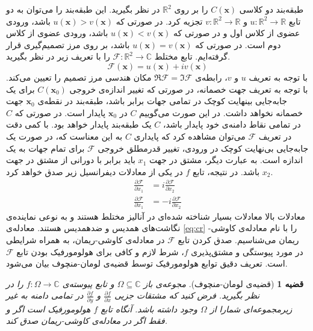 \documentclass[12pt,onecolumn,a4paper]{article}
\newtheorem{theorem}{قضیه}[section]
\begin{document}
طبقه‌بند دو کلاسی $C(\mathbf{x})$ را بر روی $\mathbb{R}^2$ در نظر بگیرید. این طبقه‌بند را می‌توان به دو تابع $u:\mathbb{R}^2 \rightarrow \mathbb{R}$ و $v:\mathbb{R}^2 \rightarrow \mathbb{R}$ تجزیه کرد. در صورتی که $u(\mathbf{x})>v(\mathbf{x})$ باشد، ورودی عضوی از کلاس اول و در صورتی که $u(\mathbf{x})<v(\mathbf{x})$ باشد، ورودی عضوی از کلاس دوم است. در صورتی که $u(\mathbf{x})=v(\mathbf{x})$ باشد، بر روی مرز تصمیم‌گیری قرار گرفته‌ایم. تابع مختلط $\mathcal{F}:\mathbb{R}^2 \rightarrow \mathbb{C}$ را با تعریف زیر در نظر بگیرید.
\begin{equation}
    \mathcal{F}(\mathbf{x})=u(\mathbf{x})+iv(\mathbf{x})
\end{equation}
با توجه به تعریف $u$ و $v$، رابطه‌ی $\Re \mathcal{F} = \Im \mathcal{F}$ مکان هندسی مرز تصمیم را تعیین می‌کند. با توجه به تعریف جهت خصمانه، در صورتی که تغییر اندازه‌ی خروجی $C(\mathbf{x}_0)$ برای یک جابه‌جایی بینهایت کوچک در تمامی جهات برابر باشد، طبقه‌بند در نقطه‌ی $\mathbf{x}_0$ جهت خصمانه نخواهد داشت. در این صورت می‌گوییم $C$ در $\mathbf{x}_0$ پایدار است. در صورتی که $C$ در تمامی نقاط دامنه‌ی خود پایدار باشد، $C$ یک طبقه‌بند پایدار خواهد بود. با کمی دقت در تعریف $\mathcal{F}$ می‌توان مشاهده کرد که پایداری $C$ به این معناست که، در صورت یک جابه‌جایی بی‌نهایت کوچک در ورودی، تغییر قدرمطلق خروجی $\mathcal{F}$ برای تمام جهات به یک اندازه است. به عبارت دیگر، مشتق در جهت $x_1$ باید برابر با دورانی از مشتق در جهت $x_2$ باشد. در نتیجه، تابع $f$ در یکی از معادلات دیفرانسیل زیر صدق خواهد کرد.
\begin{align}
    \frac{\partial \mathcal{F}}{\partial x_1} &= i\frac{\partial \mathcal{F}}{\partial x_2} \label{eq:cr}\\
    \frac{\partial \mathcal{F}}{\partial x_1} &= -i\frac{\partial \mathcal{F}}{\partial x_2}
\end{align}
معادلات بالا معادلات بسیار شناخته شده‌ای در آنالیز مختلط هستند و به نوعی نماینده‌ی نگاشت‌های همدیس و ضدهمدیس هستند. معادله‌ی \ref{eq:cr} را با نام معادله‌ی کاوشی-ریمان می‌شناسیم. صدق کردن تابع $\mathcal{F}$ در معادله‌ی کاوشی-ریمان، به همراه شرایطی در مورد پیوستگی و مشتق‌پذیری $f$، شرط لازم و کافی برای هولومورفیک بودن تابع $\mathcal{F}$ است. تعریف دقیق توابع هولومورفیک توسط قضیه‌ی لومان-منچوف بیان می‌شود.
\begin{theorem}[قضیه‌ی لومان-منچوف]
مجوعه‌ی باز $\Omega \subseteq \mathbb{C}$ و تابع پیوسته‌ی $f:\Omega \rightarrow \mathbb{C}$ را در نظر بگیرید. فرض کنید که مشتقات جزیی $\frac{\partial f}{\partial x}$ و $\frac{\partial f}{\partial y}$ در تمامی دامنه به غیر زیرمجموعه‌ای شمارا از $\Omega$ وجود داشته باشد. آنگاه تابع $f$ هولومورفیک است اگر و فقط اگر در معادله‌ی کاوشی-ریمان صدق کند.
\end{theorem}
\end{document}
